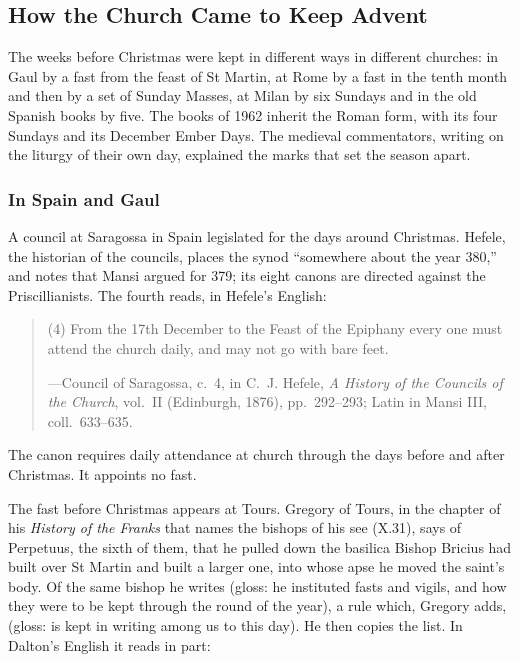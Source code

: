 \subsection{How the Church Came to Keep Advent}\label{sec:history}

The weeks before Christmas were kept in different ways in different churches: in Gaul by a fast
from the feast of St Martin, at Rome by a fast in the tenth month and then by a set of Sunday
Masses, at Milan by six Sundays and in the old Spanish books by five. The books of 1962 inherit
the Roman form, with its four Sundays and its December Ember Days. The medieval commentators,
writing on the liturgy of their own day, explained the marks that set the season apart.

\subsubsection{In Spain and Gaul}

A council at Saragossa in Spain legislated for the days around Christmas. Hefele, the historian of
the councils, places the synod ``somewhere about the year 380,'' and notes that Mansi argued for
379; its eight canons are directed against the Priscillianists. The fourth reads, in Hefele's
English:

\begin{quote}
(4) From the 17th December to the Feast of the Epiphany every one must attend the church daily,
and may not go with bare feet.\par
{\smallskip\noindent\small ---Council of Saragossa, c.~4, in C.~J. Hefele, \textit{A History of
the Councils of the Church}, vol.~II (Edinburgh, 1876), pp.~292--293; Latin in Mansi III,
coll.~633--635.\par}
\end{quote}

The canon requires daily attendance at church through the days before and after Christmas. It
appoints no fast.

The fast before Christmas appears at Tours. Gregory of Tours, in the chapter of his
\textit{History of the Franks} that names the bishops of his see (X.31), says of Perpetuus, the
sixth of them, that he pulled down the basilica Bishop Bricius had built over St Martin and
built a larger one, into whose apse he moved the saint's body. Of the same bishop he
writes  (gloss:
he instituted fasts and vigils, and how they were to be kept through the round of the year), a
rule which, Gregory adds,  (gloss: is kept in writing
among us to this day). He then copies the list. In Dalton's English it reads in part:


